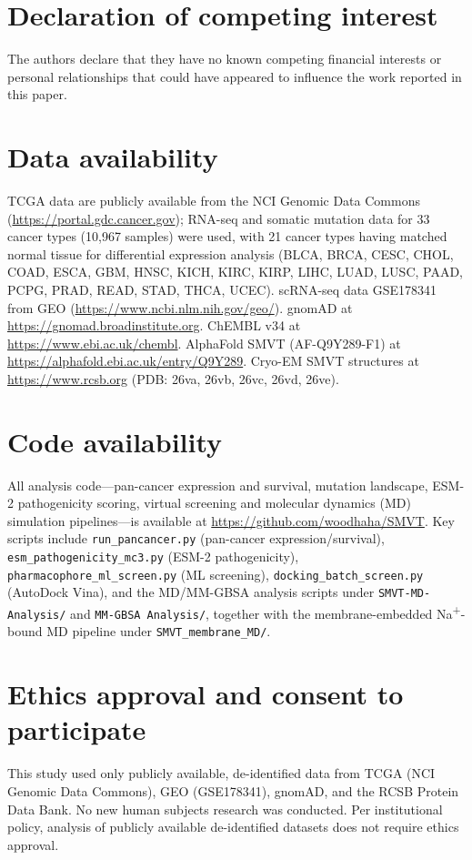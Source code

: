 \documentclass[10pt,letterpaper]{article}
\begin{document}
\section*{Declaration of competing interest}
The authors declare that they have no known competing financial interests or personal relationships that could have appeared to influence the work reported in this paper.

\section*{Data availability}
TCGA data are publicly available from the NCI Genomic Data Commons (\url{https://portal.gdc.cancer.gov}); RNA-seq and somatic mutation data for 33 cancer types (10,967 samples) were used, with 21 cancer types having matched normal tissue for differential expression analysis (BLCA, BRCA, CESC, CHOL, COAD, ESCA, GBM, HNSC, KICH, KIRC, KIRP, LIHC, LUAD, LUSC, PAAD, PCPG, PRAD, READ, STAD, THCA, UCEC). scRNA-seq data GSE178341 from GEO (\url{https://www.ncbi.nlm.nih.gov/geo/}). gnomAD at \url{https://gnomad.broadinstitute.org}. ChEMBL v34 at \url{https://www.ebi.ac.uk/chembl}. AlphaFold SMVT (AF-Q9Y289-F1) at \url{https://alphafold.ebi.ac.uk/entry/Q9Y289}. Cryo-EM SMVT structures at \url{https://www.rcsb.org} (PDB: 26va, 26vb, 26vc, 26vd, 26ve).

\section*{Code availability}
All analysis code---pan-cancer expression and survival, mutation landscape, ESM-2 pathogenicity scoring, virtual screening and molecular dynamics (MD) simulation pipelines---is available at \url{https://github.com/woodhaha/SMVT}. Key scripts include \texttt{run\_pancancer.py} (pan-cancer expression/survival), \texttt{esm\_pathogenicity\_mc3.py} (ESM-2 pathogenicity), \texttt{pharmacophore\_ml\_screen.py} (ML screening), \texttt{docking\_batch\_screen.py} (AutoDock Vina), and the MD/MM-GBSA analysis scripts under \texttt{SMVT-MD-Analysis/} and \texttt{MM-GBSA Analysis/}, together with the membrane-embedded Na\textsuperscript{+}-bound MD pipeline under \texttt{SMVT\_membrane\_MD/}.

\section*{Ethics approval and consent to participate}
This study used only publicly available, de-identified data from TCGA (NCI Genomic Data Commons), GEO (GSE178341), gnomAD, and the RCSB Protein Data Bank. No new human subjects research was conducted. Per institutional policy, analysis of publicly available de-identified datasets does not require ethics approval.
\end{document}

